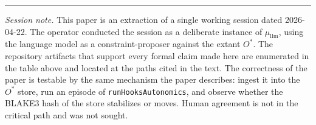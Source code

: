 \documentclass[11pt,letterpaper]{article}
\begin{document}
\vspace{1em}
\hrule
\vspace{0.8em}

\noindent\emph{Session note.} This paper is an extraction of a single working session dated 2026-04-22. The operator conducted the session as a deliberate instance of $\mu_{\mathrm{llm}}$, using the language model as a constraint-proposer against the extant $O^{\ast}$. The repository artifacts that support every formal claim made here are enumerated in the table above and located at the paths cited in the text. The correctness of the paper is testable by the same mechanism the paper describes: ingest it into the $O^{\ast}$ store, run an episode of \texttt{runHooksAutonomics}, and observe whether the BLAKE3 hash of the store stabilizes or moves. Human agreement is not in the critical path and was not sought.
\end{document}
